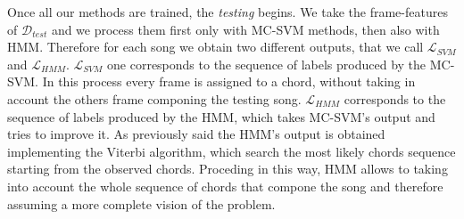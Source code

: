 %
Once all our methods are trained, the \textit{testing} begins. We take the frame-features of $\mathcal{D}_{test}$ and we process them first only with MC-SVM methods, then also with HMM. Therefore for each song we obtain two different outputs, that we call $\mathcal{L}_{SVM}$ and $\mathcal{L}_{HMM}$. $\mathcal{L}_{SVM}$ one corresponds to the sequence of labels produced by the MC-SVM. In this process every frame is assigned to a chord, without taking in account the others frame componing the testing song. $\mathcal{L}_{HMM}$ corresponds to the sequence of labels produced by the HMM, which takes MC-SVM's output and tries to improve it. As previously said the HMM's output is obtained implementing the Viterbi algorithm, which search the most likely chords sequence starting from the observed chords. Proceding in this way, HMM allows to taking into account the whole sequence of chords that compone the song and therefore assuming a more complete vision of the problem.
